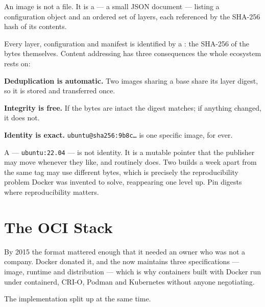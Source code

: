 An image is not a file. It is a  --- a small JSON document ---
listing a configuration object and an ordered set of layers, each referenced by
the SHA-256 hash of its contents.

\begin{definitionbox}
Every layer, configuration and manifest is identified by a : the
SHA-256 of the bytes themselves. Content addressing has three consequences the
whole ecosystem rests on:

\begin{tight}
  \item \textbf{Deduplication is automatic.} Two images sharing a base share
        its layer digest, so it is stored and transferred once.
  \item \textbf{Integrity is free.} If the bytes are intact the digest matches;
        if anything changed, it does not.
  \item \textbf{Identity is exact.} \texttt{ubuntu@sha256:9b8c\ldots} is one
        specific image, for ever.
\end{tight}

\smallskip
A  --- \texttt{ubuntu:22.04} --- is not identity. It is a mutable
pointer that the publisher may move whenever they like, and routinely does.
Two builds a week apart from the same tag may use different bytes, which is
precisely the reproducibility problem Docker was invented to solve, reappearing
one level up. Pin digests where reproducibility matters.
\end{definitionbox}

\section{The OCI Stack}

By 2015 the format mattered enough that it needed an owner who was not a
company. Docker donated it, and the  now
maintains three specifications --- image, runtime and distribution --- which is
why containers built with Docker run under containerd, CRI-O, Podman and
Kubernetes without anyone negotiating.

The implementation split up at the same time.

